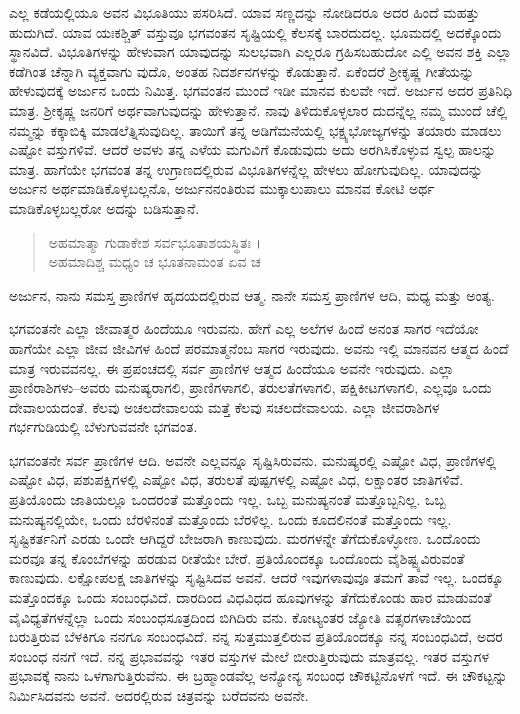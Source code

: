 ಎಲ್ಲ ಕಡೆಯಲ್ಲಿಯೂ ಅವನ ವಿಭೂತಿಯು ಪಸರಿಸಿದೆ. ಯಾವ ಸಣ್ಣದನ್ನು ನೋಡಿದರೂ ಅದರ ಹಿಂದೆ ಮಹತ್ತು ಹುದುಗಿದೆ. ಯಾವ ಯಃಕಶ್ಚಿತ್ ವಸ್ತುವೂ ಭಗವಂತನ ಸೃಷ್ಟಿಯಲ್ಲಿ ಕೆಲಸಕ್ಕೆ ಬಾರದುದಲ್ಲ. ಭೂಮದಲ್ಲಿ ಅದಕ್ಕೊಂದು ಸ್ಥಾನವಿದೆ. ವಿಭೂತಿಗಳನ್ನು ಹೇಳುವಾಗ ಯಾವುದನ್ನು ಸುಲಭವಾಗಿ ಎಲ್ಲರೂ ಗ್ರಹಿಸಬಹುದೋ ಎಲ್ಲಿ ಅವನ ಶಕ್ತಿ ಎಲ್ಲಾ ಕಡೆಗಿಂತ ಚೆನ್ನಾಗಿ ವ್ಯಕ್ತವಾಗು ವುದೊ, ಅಂತಹ ನಿದರ್ಶನಗಳನ್ನು ಕೊಡುತ್ತಾನೆ. ಏಕೆಂದರೆ ಶ್ರೀಕೃಷ್ಣ ಗೀತೆಯನ್ನು ಹೇಳುವುದಕ್ಕೆ ಅರ್ಜುನ ಒಂದು ನಿಮಿತ್ತ. ಭಗವಂತನ ಮುಂದೆ ಇಡೀ ಮಾನವ ಕುಲವೇ ಇದೆ. ಅರ್ಜುನ ಅದರ ಪ್ರತಿನಿಧಿ ಮಾತ್ರ. ಶ್ರೀಕೃಷ್ಣ ಜನರಿಗೆ ಅರ್ಥವಾಗುವುದನ್ನು ಹೇಳುತ್ತಾನೆ. ನಾವು ತಿಳಿದುಕೊಳ್ಳಲಾರ ದುದನ್ನೆಲ್ಲ ನಮ್ಮ ಮುಂದೆ ಚೆಲ್ಲಿ ನಮ್ಮನ್ನು ಕಕ್ಕಾಬಿಕ್ಕಿ ಮಾಡಲೆತ್ನಿಸುವುದಿಲ್ಲ. ತಾಯಿಗೆ ತನ್ನ ಅಡಿಗೆಮನೆಯಲ್ಲಿ ಭಕ್ಷ್ಯಭೋಜ್ಯಗಳನ್ನು ತಯಾರು ಮಾಡಲು ಎಷ್ಟೋ ವಸ್ತುಗಳಿವೆ. ಆದರೆ ಅವಳು ತನ್ನ ಎಳೆಯ ಮಗುವಿಗೆ ಕೊಡುವುದು ಅದು ಅರಗಿಸಿಕೊಳ್ಳುವ ಸ್ವಲ್ಪ ಹಾಲನ್ನು ಮಾತ್ರ. ಹಾಗೆಯೇ ಭಗವಂತ ತನ್ನ ಉಗ್ರಾಣದಲ್ಲಿರುವ ವಿಭೂತಿಗಳನ್ನೆಲ್ಲ ಹೇಳಲು ಹೋಗುವುದಿಲ್ಲ. ಯಾವುದನ್ನು ಅರ್ಜುನ ಅರ್ಥಮಾಡಿಕೊಳ್ಳಬಲ್ಲನೊ, ಅರ್ಜುನನಂತಿರುವ ಮುಕ್ಕಾಲುಪಾಲು ಮಾನವ ಕೋಟಿ ಅರ್ಥ ಮಾಡಿಕೊಳ್ಳಬಲ್ಲರೋ ಅದನ್ನು ಬಡಿಸುತ್ತಾನೆ.

\begin{verse}
ಅಹಮಾತ್ಮಾ ಗುಡಾಕೇಶ ಸರ್ವಭೂತಾಶಯಸ್ಥಿತಃ ।\\ಅಹಮಾದಿಶ್ಚ ಮಧ್ಯಂ ಚ ಭೂತನಾಮಂತ ಏವ ಚ 
\end{verse}

{\small ಅರ್ಜುನ, ನಾನು ಸಮಸ್ತ ಪ್ರಾಣಿಗಳ ಹೃದಯದಲ್ಲಿರುವ ಆತ್ಮ. ನಾನೇ ಸಮಸ್ತ ಪ್ರಾಣಿಗಳ ಆದಿ, ಮಧ್ಯ ಮತ್ತು ಅಂತ್ಯ.}

ಭಗವಂತನೇ ಎಲ್ಲಾ ಜೀವಾತ್ಮರ ಹಿಂದೆಯೂ ಇರುವನು. ಹೇಗೆ ಎಲ್ಲ ಅಲೆಗಳ ಹಿಂದೆ ಅನಂತ ಸಾಗರ ಇದೆಯೋ ಹಾಗೆಯೇ ಎಲ್ಲಾ ಜೀವ ಜೀವಿಗಳ ಹಿಂದೆ ಪರಮಾತ್ಮನೆಂಬ ಸಾಗರ ಇರುವುದು. ಅವನು ಇಲ್ಲಿ ಮಾನವನ ಆತ್ಮದ ಹಿಂದೆ ಮಾತ್ರ ಇರುವವನಲ್ಲ. ಈ ಪ್ರಪಂಚದಲ್ಲಿ ಸರ್ವ ಪ್ರಾಣಿಗಳ ಆತ್ಮದ ಹಿಂದೆಯೂ ಅವನೇ ಇರುವುದು. ಎಲ್ಲಾ ಪ್ರಾಣಿರಾಶಿಗಳು–ಅವರು ಮನುಷ್ಯರಾಗಲಿ, ಪ್ರಾಣಿಗಳಾಗಲಿ, ತರುಲತೆಗಳಾಗಲಿ, ಪಕ್ಷಿಕೀಟಗಳಾಗಲಿ, ಎಲ್ಲವೂ ಒಂದು ದೇವಾಲಯದಂತೆ. ಕೆಲವು ಅಚಲದೇವಾಲಯ ಮತ್ತೆ ಕೆಲವು ಸಚಲದೇವಾಲಯ. ಎಲ್ಲಾ ಜೀವರಾಶಿಗಳ ಗರ್ಭಗುಡಿಯಲ್ಲಿ ಬೆಳುಗುವವನೇ ಭಗವಂತ.

ಭಗವಂತನೇ ಸರ್ವ ಪ್ರಾಣಿಗಳ ಆದಿ. ಅವನೇ ಎಲ್ಲವನ್ನೂ ಸೃಷ್ಟಿಸಿರುವನು. ಮನುಷ್ಯರಲ್ಲಿ ಎಷ್ಟೋ ವಿಧ, ಪ್ರಾಣಿಗಳಲ್ಲಿ ಎಷ್ಟೋ ವಿಧ, ಪಶುಪಕ್ಷಿಗಳಲ್ಲಿ ಎಷ್ಟೋ ವಿಧ, ತರುಲತೆ ಪುಷ್ಪಗಳಲ್ಲಿ ಎಷ್ಟೋ ವಿಧ, ಲಕ್ಷಾಂತರ ಜಾತಿಗಳಿವೆ. ಪ್ರತಿಯೊಂದು ಜಾತಿಯಲ್ಲೂ ಒಂದರಂತೆ ಮತ್ತೊಂದು ಇಲ್ಲ. ಒಬ್ಬ ಮನುಷ್ಯನಂತೆ ಮತ್ತೊಬ್ಬನಿಲ್ಲ. ಒಬ್ಬ ಮನುಷ್ಯನಲ್ಲಿಯೇ, ಒಂದು ಬೆರಳಿನಂತೆ ಮತ್ತೊಂದು ಬೆರಳಿಲ್ಲ. ಒಂದು ಕೂದಲಿನಂತೆ ಮತ್ತೊಂದು ಇಲ್ಲ. ಸೃಷ್ಟಿಕರ್ತನಿಗೆ ಎರಡು ಒಂದೇ ಆಗಿದ್ದರೆ ಬೇಜರಾಗಿ ಕಾಣುವುದು. ಮರಗಳನ್ನೇ ತೆಗೆದುಕೊಳ್ಳೋಣ. ಒಂದೊಂದು ಮರವೂ ತನ್ನ ಕೊಂಬೆಗಳನ್ನು ಹರಡುವ ರೀತೆಯೇ ಬೇರೆ. ಪ್ರತಿಯೊಂದಕ್ಕೂ ಒಂದೊಂದು ವೈಶಿಷ್ಟ್ಯವಿರುವಂತೆ ಕಾಣುವುದು. ಲಕ್ಷೋಪಲಕ್ಷ ಜಾತಿಗಳನ್ನು ಸೃಷ್ಟಿಸಿದವ ಅವನೆ. ಆದರೆ ಇವುಗಳಾವುವೂ ತಮಗೆ ತಾವೆ ಇಲ್ಲ. ಒಂದಕ್ಕೂ ಮತ್ತೊಂದಕ್ಕೂ ಒಂದು ಸಂಬಂಧವಿದೆ. ದಾರದಿಂದ ವಿಧವಿಧದ ಹೂವುಗಳನ್ನು ತೆಗೆದುಕೊಂಡು ಹಾರ ಮಾಡುವಂತೆ ವೈವಿಧ್ಯತೆಗಳನ್ನೆಲ್ಲಾ ಒಂದು ಸಂಬಂಧಸೂತ್ರದಿಂದ ಬಿಗಿದಿರು ವನು. ಕೋಟ್ಯಂತರ ಜ್ಯೋತಿ ವತ್ಸರಗಳಾಚೆಯಿಂದ ಬರುತ್ತಿರುವ ಬೆಳಕಿಗೂ ನನಗೂ ಸಂಬಂಧವಿದೆ. ನನ್ನ ಸುತ್ತಮುತ್ತಲಿರುವ ಪ್ರತಿಯೊಂದಕ್ಕೂ ನನ್ನ ಸಂಬಂಧವಿದೆ, ಅದರ ಸಂಬಂಧ ನನಗೆ ಇದೆ. ನನ್ನ ಪ್ರಭಾವವನ್ನು ಇತರ ವಸ್ತುಗಳ ಮೇಲೆ ಬೀರುತ್ತಿರುವುದು ಮಾತ್ರವಲ್ಲ. ಇತರ ವಸ್ತುಗಳ ಪ್ರಭಾವಕ್ಕೆ ನಾನು ಒಳಗಾಗುತ್ತಿರುವೆನು. ಈ ಬ್ರಹ್ಮಾಂಡವೆಲ್ಲ ಅನ್ಯೋನ್ಯ ಸಂಬಂಧ ಚೌಕಟ್ಟಿನೊಳಗೆ ಇದೆ. ಈ ಚೌಕಟ್ಟನ್ನು ನಿರ್ಮಿಸಿದವನು ಅವನೆ. ಅದರಲ್ಲಿರುವ ಚಿತ್ರವನ್ನು ಬರೆದವನು ಅವನೇ.

